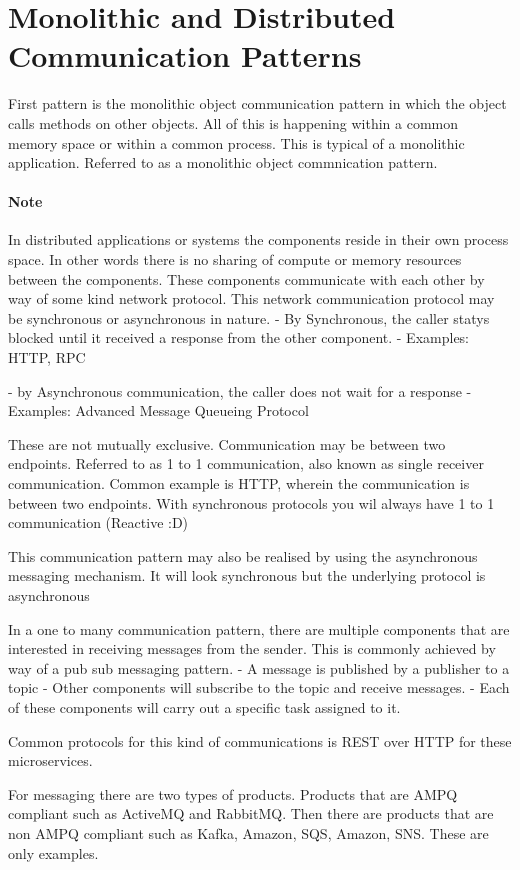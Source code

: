 \section{Monolithic and Distributed Communication Patterns}
First pattern is the monolithic object communication pattern in which the object calls methods on other objects.
All of this is happening within a common memory space or within a common process.
This is typical of a monolithic application.
Referred to as a monolithic object commnication pattern.

\paragraph{Note}
In distributed applications or systems the components reside in their own process space.
In other words there is no sharing of compute or memory resources between the components.
These components communicate with each other by way of some kind network protocol.
This network communication protocol may be synchronous or asynchronous in nature.
- By Synchronous, the caller statys blocked until it received a response from the other component.
- Examples: HTTP, RPC

- by Asynchronous communication, the caller does not wait for a response
- Examples: Advanced Message Queueing Protocol

These are not mutually exclusive.
Communication may be between two endpoints.
Referred to as 1 to 1 communication, also known as single receiver communication.
Common example is HTTP, wherein the communication is between two endpoints.
With synchronous protocols you wil always have 1 to 1 communication (Reactive :D)

This communication pattern may also be realised by using the asynchronous messaging mechanism.
It will look synchronous but the underlying protocol is asynchronous

In a one to many communication pattern, there are multiple components that are interested in receiving messages from the sender.
This is commonly achieved by way of a pub sub messaging pattern.
- A message is published by a publisher to a topic
- Other components will subscribe to the topic and receive messages.
- Each of these components will carry out a specific task assigned to it.

Common protocols for this kind of communications is REST over HTTP for these microservices.

For messaging there are two types of products. Products that are AMPQ compliant such as ActiveMQ and RabbitMQ.
Then there are products that are non AMPQ compliant such as Kafka, Amazon, SQS, Amazon, SNS. These are only examples.

